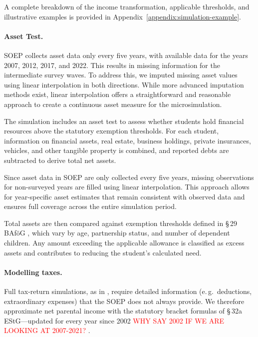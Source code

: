 A complete breakdown of the income transformation, applicable thresholds, and illustrative examples is provided in Appendix~\ref{appendix:simulation-example}.

\paragraph{Asset Test.}
SOEP collects asset data only every five years, with available data for the years 2007, 2012, 2017, and 2022. 
This results in missing information for the intermediate survey waves. 
To address this, we imputed missing asset values using linear interpolation in both directions. 
While more advanced imputation methods exist, linear interpolation offers a straightforward and reasonable approach to create a continuous asset measure for the microsimulation.

The simulation includes an asset test to assess whether students hold financial resources above the statutory exemption thresholds. 
For each student, information on financial assets, real estate, business holdings, private insurances, vehicles, and other tangible property is combined, and reported debts are subtracted to derive total net assets.

Since asset data in SOEP are only collected every five years, missing observations for non-surveyed years are filled using linear interpolation. 
This approach allows for year-specific asset estimates that remain consistent with observed data and ensures full coverage across the entire simulation period.

Total assets are then compared against exemption thresholds defined in §\,29 BAföG \citep{bafoeg_law}, which vary by age, partnership status, and number of dependent children. 
Any amount exceeding the applicable allowance is classified as excess assets and contributes to reducing the student's calculated need. 

\paragraph{Modelling taxes.}
Full tax‑return simulations, as in \cite{herber_non-take-up_2019}, require detailed information (e.\,g.\ deductions, extraordinary expenses) that the SOEP does not always provide.  
We therefore approximate net parental income with the statutory bracket formulas of §\,32a EStG—updated for every year since 2002 
\textcolor{red}{WHY SAY 2002 IF WE ARE LOOKING AT 2007-2021?} \citep{estg_law,estg_2025,estg_2024,estg_2023,estg_2022,estg_2021,estg_2020,estg_2019,estg_2018,estg_2017,estg_2016,estg_2015,estg_2014,estg_2013,estg_2012,estg_2007,estg_2006,estg_lohninfo_2012}.  

